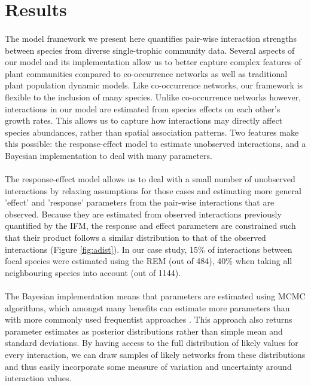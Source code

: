 \documentclass[a4,12pt]{article}
\begin{document}
\section{Results}

    \paragraph{}
    The model framework we present here quantifies pair-wise interaction strengths between species from diverse single-trophic community data. Several aspects of our model and its implementation allow us to better capture complex features of plant communities compared to co-occurrence networks as well as traditional plant population dynamic models. Like co-occurrence networks, our framework is flexible to the inclusion of many species. Unlike co-occurrence networks however, interactions in our model are estimated from species effects on each other's growth rates. This allows us to capture how interactions may directly affect species abundances, rather than spatial association patterns. Two features make this possible: the response-effect model to estimate unobserved interactions, and a Bayesian implementation to deal with many parameters. 

    \paragraph{}
    The response-effect model allows us to deal with a small number of unobserved interactions by relaxing assumptions for those cases and estimating more general 'effect' and 'response' parameters from the pair-wise interactions that are observed. Because they are estimated from observed interactions previously quantified by the IFM, the response and effect parameters are constrained such that their product follows a similar distribution to that of the observed interactions (Figure \ref{fig:adist}). In our case study, 15\% of interactions between focal species were estimated using the REM (out of 484), 40\% when taking all neighbouring species into account (out of 1144). 


    \paragraph{}
    The Bayesian implementation means that parameters are estimated using MCMC algorithms, which amongst many benefits can estimate more parameters than with more commonly used frequentist approaches \citep{Dorazio2016}. This approach also returns parameter estimates as posterior distributions rather than simple mean and standard deviations. By having access to the full distribution of likely values for every interaction, we can draw samples of likely networks from these distributions and thus easily incorporate some measure of variation and uncertainty around interaction values. %
\end{document}
